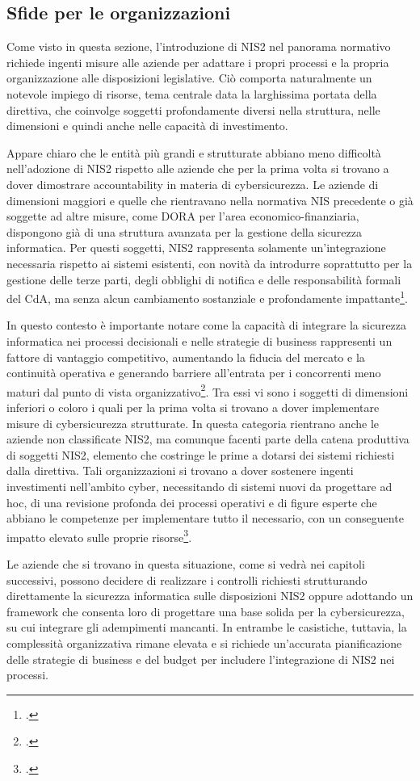 \subsection{Sfide per le organizzazioni}
Come visto in questa sezione, l'introduzione di NIS2 nel panorama normativo richiede ingenti misure alle aziende
per adattare i propri processi e la propria organizzazione alle disposizioni legislative. Ciò comporta naturalmente
un notevole impiego di risorse, tema centrale data la larghissima portata della direttiva, che coinvolge soggetti
profondamente diversi nella struttura, nelle dimensioni e quindi anche nelle capacità di investimento.

Appare chiaro che le entità più grandi e strutturate abbiano meno difficoltà nell'adozione di NIS2 rispetto alle 
aziende che per la prima volta si trovano a dover dimostrare accountability in materia di cybersicurezza.
Le aziende di dimensioni maggiori e quelle che rientravano nella normativa NIS precedente o già soggette ad altre
misure, come DORA per l'area economico-finanziaria, dispongono già di una struttura avanzata per la gestione
della sicurezza informatica. Per questi soggetti, NIS2 rappresenta solamente un'integrazione necessaria rispetto
ai sistemi esistenti, con novità da introdurre soprattutto per la gestione delle terze parti, degli obblighi di
notifica e delle responsabilità formali del CdA, ma senza alcun cambiamento sostanziale e profondamente impattante\footcite[pp. 2--5]{ecso-whitepaper-nis2}.

In questo contesto è importante notare come la capacità di integrare la sicurezza informatica nei processi decisionali 
e nelle strategie di business rappresenti un fattore di vantaggio competitivo, aumentando la fiducia del mercato 
e la continuità operativa e generando barriere all’entrata per i concorrenti meno maturi dal punto di vista organizzativo\footcite{testo-som}.
Tra essi vi sono i soggetti di dimensioni inferiori o coloro i quali per la prima volta si trovano a dover
implementare misure di cybersicurezza strutturate. In questa categoria rientrano anche le aziende non classificate NIS2, 
ma comunque facenti parte della catena produttiva di soggetti NIS2, elemento che costringe le prime a dotarsi dei 
sistemi richiesti dalla direttiva.
Tali organizzazioni si trovano a dover sostenere ingenti investimenti nell'ambito cyber, necessitando di sistemi
nuovi da progettare ad hoc, di una revisione profonda dei processi operativi e di figure esperte che 
abbiano le competenze per implementare tutto il necessario, con un conseguente impatto elevato sulle proprie risorse\footcite[pp. 2--5]{ecso-whitepaper-nis2}.

Le aziende che si trovano in questa situazione, come si vedrà nei capitoli successivi, possono decidere di realizzare
i controlli richiesti strutturando direttamente la sicurezza informatica sulle disposizioni NIS2 oppure adottando un 
framework che consenta loro di progettare una base solida per la cybersicurezza, su cui integrare gli adempimenti mancanti. 
In entrambe le casistiche, tuttavia, la complessità organizzativa
rimane elevata e si richiede un'accurata pianificazione delle strategie di business e del budget per includere l'integrazione
di NIS2 nei processi.
